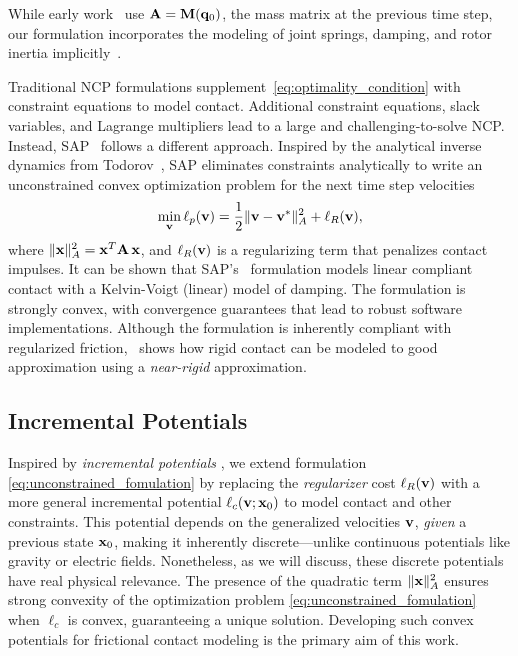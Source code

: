 While early work~\cite{bib:stewart1996implicit, bib:anitescu1997} use ${\mathbf{A}} =
{\mathbf{M}}({\mathbf{q}}_0)$, the mass matrix at the previous time step, our formulation
incorporates the modeling of joint springs, damping, and rotor inertia
implicitly~\cite{bib:castro2022unconstrained}. 

Traditional NCP formulations supplement~\eqref{eq:optimality_condition} with
constraint equations to model contact. Additional constraint equations, slack
variables, and Lagrange multipliers lead to a large and challenging-to-solve NCP.
Instead, SAP~\cite{bib:castro2022unconstrained} follows a different approach.
Inspired by the analytical inverse dynamics from Todorov~\cite{bib:todorov2011},
SAP eliminates constraints analytically to write an unconstrained convex
optimization problem for the next time step velocities
\begin{eqnarray}
	\min_{\mf{v}} \ell_p(\mf{v}) = \frac{1}{2}\Vert\mf{v}-\mf{v}^*\Vert_{A}^2 +
	\ell_R(\mf{v}),
    \label{eq:unconstrained_fomulation}
\end{eqnarray}
where $\Vert{\mathbf{x}}\Vert_{A}^2 = {\mathbf{x}}^T{\mathbf{A}}\,{\mathbf{x}}$, and $\ell_R({\mathbf{v}})$ is
a regularizing term that penalizes contact impulses. It can be shown that
SAP's~\cite{bib:castro2022unconstrained} formulation models linear compliant contact
with a Kelvin-Voigt (linear) model of damping. The formulation is strongly
convex, with convergence guarantees that lead to robust software
implementations. Although the formulation is inherently compliant with
regularized friction, \cite{bib:castro2022unconstrained}~shows how rigid contact
can be modeled to good approximation using a \emph{near-rigid} approximation.

\subsection{Incremental Potentials}

Inspired by \emph{incremental potentials} \cite{bib:li2020ipc,
bib:pandolfi2002}, we extend formulation \eqref{eq:unconstrained_fomulation} by
replacing the \emph{regularizer} cost $\ell_R({\mathbf{v}})$ with a more general
incremental potential $\ell_c({\mathbf{v}}; {\mathbf{x}}_0)$ to model contact and other
constraints. This potential depends on the generalized velocities ${\mathbf{v}}$,
\emph{given} a previous state ${\mathbf{x}}_0$, making it inherently discrete---unlike
continuous potentials like gravity or electric fields. Nonetheless, as we will
discuss, these discrete potentials have real physical relevance. The presence of
the quadratic term $\Vert{\mathbf{x}}\Vert_{A}^2$ ensures strong convexity of the
optimization problem \eqref{eq:unconstrained_fomulation} when $\ell_c$ is
convex, guaranteeing a unique solution. Developing such convex potentials for
frictional contact modeling is the primary aim of this work.

